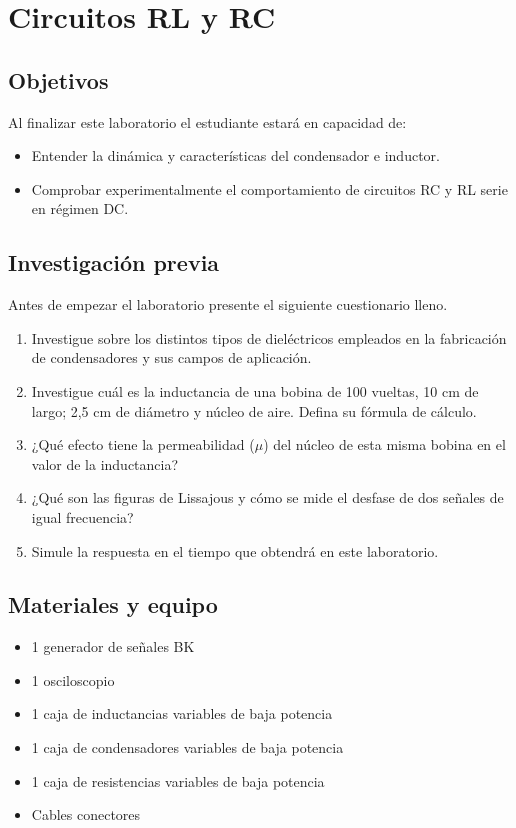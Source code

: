 \documentclass{report}
\newcommand{\obj}{Objetivos}
\newcommand{\inv}{Investigación previa}
\newcommand{\mat}{Materiales y equipo}
\newcommand{\capacidad}{Al finalizar este laboratorio el estudiante estará en capacidad de:}
\newcommand{\antesde}{Antes de empezar el laboratorio presente el siguiente cuestionario lleno.}
\begin{document}
\chapter{Circuitos RL y RC}

\section{\obj}
\capacidad
\begin{itemize}
\item Entender la dinámica y características del condensador e inductor.
\item Comprobar experimentalmente el comportamiento de circuitos RC y RL serie
en régimen DC.
\end{itemize}

\section{\inv}
\antesde
\begin{enumerate}
\item Investigue sobre los distintos tipos de dieléctricos empleados en la
fabricación de condensadores y sus campos de aplicación.
\item Investigue cuál es la inductancia de una bobina de 100 vueltas, 10 cm de
largo; 2,5 cm de diámetro y núcleo de aire. Defina su fórmula de cálculo.
\item ¿Qué efecto tiene la permeabilidad ($\mu$) del núcleo de esta misma bobina en
el valor de la inductancia?
\item ¿Qué son las figuras de Lissajous y cómo se mide el desfase de dos señales
de igual frecuencia?
\item Simule la respuesta en el tiempo que obtendrá en este laboratorio.
\end{enumerate}

\section{\mat}
\begin{itemize}
\item 1 generador de señales BK
\item 1 osciloscopio
\item 1 caja de inductancias variables de baja potencia
\item 1 caja de condensadores variables de baja potencia
\item 1 caja de resistencias variables de baja potencia
\item Cables conectores
\end{itemize}
\end{document}
